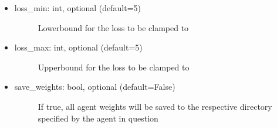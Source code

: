 \documentclass[letterpaper,10pt,english]{sphinxmanual}
\begin{document}
\begin{itemize}
\item {} \begin{description}
\item[{loss\_min: int, optional (default=\sphinxhyphen{}5)}] \leavevmode
\sphinxAtStartPar
Lower\sphinxhyphen{}bound for the loss to be clamped to

\end{description}

\item {} \begin{description}
\item[{loss\_max: int, optional (default=5)}] \leavevmode
\sphinxAtStartPar
Upper\sphinxhyphen{}bound for the loss to be clamped to

\end{description}

\item {} \begin{description}
\item[{save\_weights: bool, optional (default=False)}] \leavevmode
\sphinxAtStartPar
If true, all agent weights will be saved to the respective directory specified by the agent in question

\end{description}

\end{itemize}

\sphinxAtStartPar
{}

\begin{sphinxVerbatim}[commandchars=\\\{\},numbers=left,firstnumber=1,stepnumber=1]
  
  
  

    
\end{sphinxVerbatim}
\end{document}
